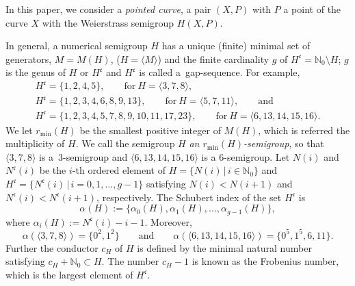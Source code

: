 \documentclass[10pt,a4paper]{amsart}
\def\NN{{\mathbb N}}
\def\fc{{\mathfrak c}}
\numberwithin{equation}{section}
\begin{document}
In this paper, we consider a \emph{pointed curve}, a pair $(X,P)$ with $P$ a point of the curve $X$ with the Weierstrass semigroup $H(X,P)$.

In general, a numerical semigroup $H$ has a unique (finite) minimal set of generators, $M=M(H)$, ($H=\langle M\rangle$) and the finite cardinality $g$ of $H^\fc=\NN_0\setminus H$; $g$ is the genus of $H$ or $H^\fc$ and $H^\fc$ is called a~gap-sequence.
For example,
\begin{gather*}
H^\fc=\{1, 2, 4, 5\}, \qquad \text{for} \ H=\langle 3,7,8\rangle, \\
H^\fc=\{1,2,3,4,6,8,9,13\}, \qquad \text{for} \ H=\langle 5,7,11\rangle,\qquad
\text{and} \\
H^\fc=
\{1,2,3,4,5,7,8,9,10,11,17,23\}, \qquad \text{for}
\ H=\langle6,13,14,15,16\rangle.
\end{gather*}
We let $r_{\min}(H)$ be the smallest positive integer of $M(H)$, which is referred the multiplicity of $H$.
We call the semigroup $H$ \emph{an $r_{\min}(H)$-semigroup}, so that $\langle 3,7,8\rangle$ is a~$3$-semigroup and $\langle 6,13,14,15,16\rangle$ is a $6$-semigroup.
Let $N(i)$ and $N^\fc(i)$ be the $i$-th ordered element of $H=\{N(i)\, |\, i \in \NN_0\}$ and $H^\fc=\{N^\fc(i)\, |\, i = 0, 1, \dots, g-1\}$ satisfying $N(i) < N(i+1)$ and $N^\fc(i) < N^\fc(i+1)$, respectively.
The Schubert index of the set $H^\fc$ is
\begin{equation*}
\alpha(H) :=\{\alpha_0(H), \alpha_1(H), \dots, \alpha_{g-1}(H)\},%
\end{equation*}
where $\alpha_i(H) := N^\fc(i) - i -1$.
Moreover,
\[
\alpha(\langle 3,7,8\rangle) =\big\{0^2, 1^2\big\}
\qquad\text{and}\qquad
\alpha(\langle 6,13,14,15,16\rangle) =\big\{0^5, 1^5, 6, 11\big\}.
\]
Further the conductor $c_H$ of $H$ is defined by the minimal natural number satisfying ${c_H + \NN_0 \subset H}$.
The number $c_H-1$ is known as the Frobenius number, which is the largest element of $H^\fc$.
\end{document}
